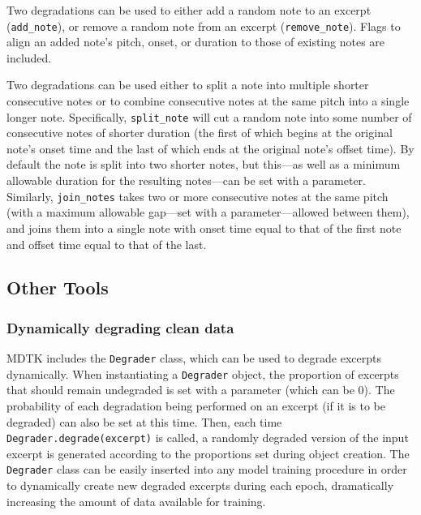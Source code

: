 \documentclass{article}
\begin{document}
Two degradations can be used to either add a random note to an excerpt (\texttt{\mbox{add_note}}), or remove a random note from an excerpt (\texttt{\mbox{remove_note}}). Flags to align an added note's pitch, onset, or duration to those of existing notes are included.

Two degradations can be used either to split a note into multiple shorter consecutive notes or to combine consecutive notes at the same pitch into a single longer note. Specifically, \texttt{\mbox{split_note}} will cut a random note into some number of consecutive notes of shorter duration (the first of which begins at the original note's onset time and the last of which ends at the original note's offset time). By default the note is split into two shorter notes, but this---as well as a minimum allowable duration for the resulting notes---can be set with a parameter. Similarly, \texttt{\mbox{join_notes}} takes two or more consecutive notes at the same pitch (with a maximum allowable gap---set with a parameter---allowed between them), and joins them into a single note with onset time equal to that of the first note and offset time equal to that of the last.

\subsection{Other Tools}
\label{subsec:tools}
\subsubsection{Dynamically degrading clean data}
MDTK includes the \texttt{\mbox{Degrader}} class, which can be used to degrade excerpts dynamically. When instantiating a \texttt{\mbox{Degrader}} object, the proportion of excerpts that should remain undegraded is set with a parameter (which can be 0). The probability of each degradation being performed on an excerpt (if it is to be degraded) can also be set at this time. Then, each time \texttt{Degrader.degrade(excerpt)} is called, a randomly degraded version of the input excerpt is generated according to the proportions set during object creation. The \texttt{\mbox{Degrader}} class can be easily inserted into any model training procedure in order to dynamically create new degraded excerpts during each epoch, dramatically increasing the amount of data available for training.
\end{document}
